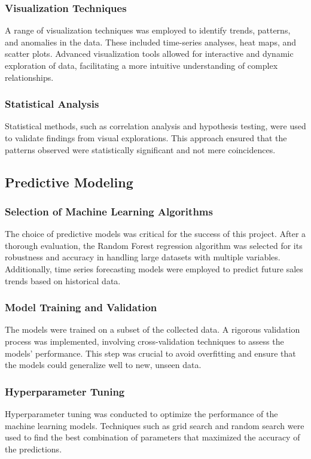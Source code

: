 \documentclass[conference]{IEEEtran}
\begin{document}
\subsubsection{Visualization Techniques}
A range of visualization techniques was employed to identify trends, patterns, and anomalies in the data. These included time-series analyses, heat maps, and scatter plots. Advanced visualization tools allowed for interactive and dynamic exploration of data, facilitating a more intuitive understanding of complex relationships.

\subsubsection{Statistical Analysis}
Statistical methods, such as correlation analysis and hypothesis testing, were used to validate findings from visual explorations. This approach ensured that the patterns observed were statistically significant and not mere coincidences.

\subsection{Predictive Modeling}

\subsubsection{Selection of Machine Learning Algorithms}
The choice of predictive models was critical for the success of this project. After a thorough evaluation, the Random Forest regression algorithm was selected for its robustness and accuracy in handling large datasets with multiple variables. Additionally, time series forecasting models were employed to predict future sales trends based on historical data.

\subsubsection{Model Training and Validation}
The models were trained on a subset of the collected data. A rigorous validation process was implemented, involving cross-validation techniques to assess the models' performance. This step was crucial to avoid overfitting and ensure that the models could generalize well to new, unseen data.

\subsubsection{Hyperparameter Tuning}
Hyperparameter tuning was conducted to optimize the performance of the machine learning models. Techniques such as grid search and random search were used to find the best combination of parameters that maximized the accuracy of the predictions.
\end{document}
